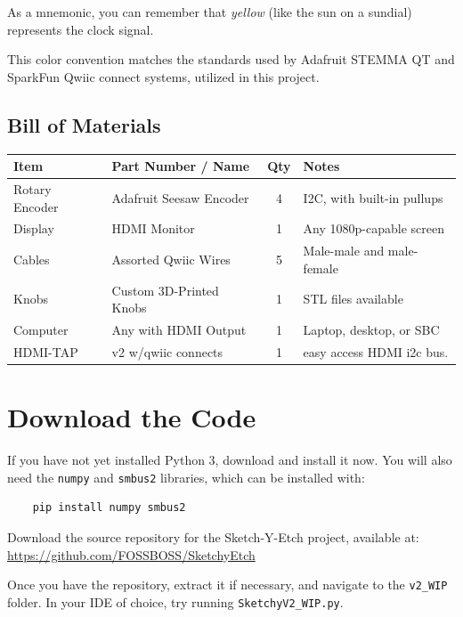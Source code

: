 \documentclass[]{article}
\begin{document}
As a mnemonic, you can remember that \textit{yellow} (like the sun on a sundial) represents the clock signal.

This color convention matches the standards used by Adafruit STEMMA QT and SparkFun Qwiic connect systems, utilized in this project.

\subsection*{Bill of Materials}

\begin{center}
	\begin{tabular}{|l|l|c|l|}
		\hline
		\textbf{Item} & \textbf{Part Number / Name} & \textbf{Qty} & \textbf{Notes} \\
		\hline
		Rotary Encoder & Adafruit Seesaw Encoder   & 4 & I2C, with built-in pullups \\
		Display        & HDMI Monitor              & 1 & Any 1080p-capable screen \\
		Cables         & Assorted Qwiic Wires      & 5 & Male-male and male-female \\
		Knobs          & Custom 3D-Printed Knobs   & 1 & STL files available \\
		Computer       & Any with HDMI Output      & 1 & Laptop, desktop, or SBC \\
		HDMI-TAP       & v2 w/qwiic connects	   & 1 &  easy access HDMI i2c bus.\\
		
		\hline
	\end{tabular}
\end{center}



\section*{Download the Code}

If you have not yet installed Python 3, download and install it now.  
You will also need the \texttt{numpy} and \texttt{smbus2} libraries, which can be installed with:

\begin{verbatim}
	pip install numpy smbus2
\end{verbatim}

Download the source repository for the Sketch-Y-Etch project, available at:  
\url{https://github.com/FOSSBOSS/SketchyEtch}

Once you have the repository, extract it if necessary, and navigate to the \texttt{v2\_WIP} folder.  
In your IDE of choice, try running \texttt{SketchyV2\_WIP.py}.
\end{document}
